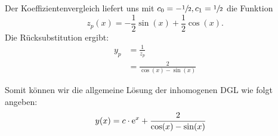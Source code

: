 \documentclass[main.tex]{subfiles}
\begin{document}
Der Koeffizientenvergleich liefert uns mit $c_0 = -\sfrac{1}{2}, c_1 = \sfrac{1}{2}$ die Funktion
$$
	z_p(x) = -\frac{1}{2} \sin(x) + \frac{1}{2}\cos(x).
$$
Die Rücksubstitution ergibt:
\begin{align*}
	y_p &= \frac{1}{z_p} \\
	    &= \frac{2}{\cos(x) - \sin(x)}
\end{align*}

Somit können wir die allgemeine Lösung der inhomogenen DGL wie folgt angeben:
\begin{align*}
	y(x) &= c \cdot \mathrm{e}^{x} + \frac{2}{\cos(x) - \sin(x)}
\end{align*}
\end{document}
